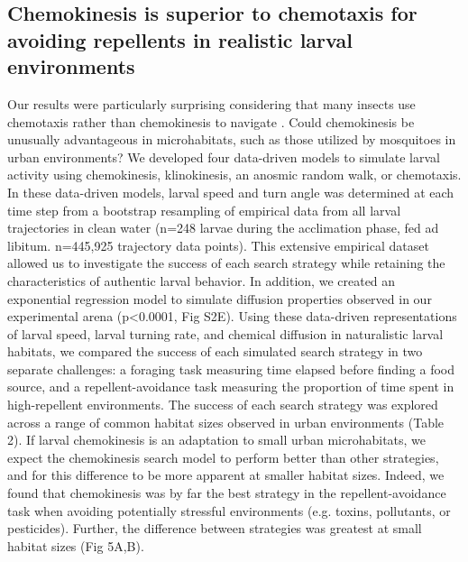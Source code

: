 \subsection*{Chemokinesis is superior to chemotaxis for avoiding repellents in realistic larval environments}
\noindent Our results were particularly surprising considering that many insects use chemotaxis rather than chemokinesis to navigate \cite{Gomez-Marin2011-tn}. Could chemokinesis be unusually advantageous in microhabitats, such as those utilized by mosquitoes in urban environments? We developed four data-driven models to simulate larval activity using chemokinesis, klinokinesis, an anosmic random walk, or chemotaxis. In these data-driven models, larval speed and turn angle was determined at each time step from a bootstrap resampling of empirical data from all larval trajectories in clean water (n=248 larvae during the acclimation phase, fed ad libitum. n=445,925 trajectory data points). This extensive empirical dataset allowed us to investigate the success of each search strategy while retaining the characteristics of authentic larval behavior. In addition, we created an exponential regression model to simulate diffusion properties observed in our experimental arena (p<0.0001, Fig S2E). Using these data-driven representations of larval speed, larval turning rate, and chemical diffusion in naturalistic larval habitats, we compared the success of each simulated search strategy in two separate challenges: a foraging task measuring time elapsed before finding a food source, and a repellent-avoidance task measuring the proportion of time spent in high-repellent environments. The success of each search strategy was explored across a range of common habitat sizes observed in urban environments \cite{Chan1971-sr} (Table 2). If larval chemokinesis is an adaptation to small urban microhabitats, we expect the chemokinesis search model to perform better than other strategies, and for this difference to be more apparent at smaller habitat sizes. Indeed, we found that chemokinesis was by far the best strategy in the repellent-avoidance task when avoiding potentially stressful environments (e.g. toxins, pollutants, or pesticides). Further, the difference between strategies was greatest at small habitat sizes (Fig 5A,B). 

